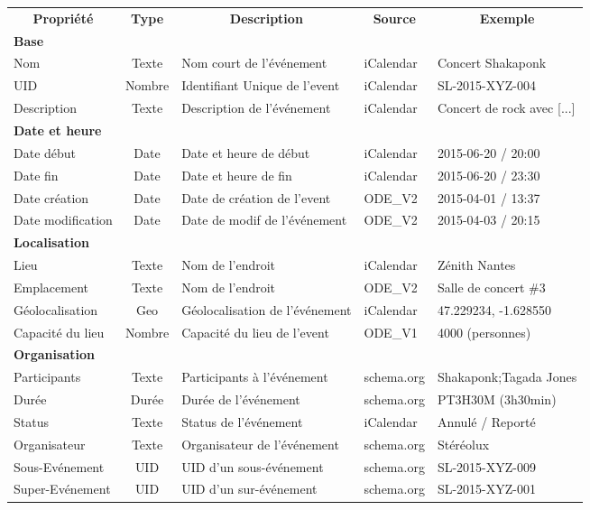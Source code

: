 \begin{table}[h]
\begin{adjustwidth}{-1.8cm}{}
\begin{tabular}{lclll}
\multicolumn{1}{c}{{\bf Propriété}} & {\bf Type} & \multicolumn{1}{c}{{\bf Description}} & \multicolumn{1}{c}{{\bf Source}} & \multicolumn{1}{c}{{\bf Exemple}} \\

{\bf Base} &  &  &  &  \\

Nom & Texte & Nom court de l'événement & iCalendar & Concert Shakaponk \\
UID & Nombre & Identifiant Unique de l'event & iCalendar & SL-2015-XYZ-004 \\
Description & Texte & Description de l'événement & iCalendar & Concert de rock avec {[}...{]} \\

{\bf Date et heure} &  &  &  &  \\

Date début & Date & Date et heure de début & iCalendar & 2015-06-20 / 20:00 \\
Date fin & Date & Date et heure de fin & iCalendar & 2015-06-20 / 23:30 \\
Date création & Date & Date de création de l'event & ODE\_V2 & 2015-04-01 / 13:37 \\
Date modification & Date & Date de modif de l'événement & ODE\_V2 & 2015-04-03 / 20:15 \\

{\bf Localisation} &  &  &  &  \\

Lieu & Texte & Nom de l'endroit & iCalendar & Zénith Nantes \\
Emplacement & Texte & Nom de l'endroit & ODE\_V2 & Salle de concert \#3 \\
Géolocalisation & Geo & Géolocalisation de l'événement & iCalendar & 47.229234, -1.628550 \\
Capacité du lieu & Nombre & Capacité du lieu de l'event & ODE\_V1 & 4000 (personnes) \\

{\bf Organisation} &  &  &  &  \\

Participants & Texte & Participants à l'événement & schema.org & Shakaponk;Tagada Jones \\
Durée & Durée & Durée de l'événement & schema.org & PT3H30M (3h30min) \\
Status & Texte & Status de l'événement & iCalendar & Annulé / Reporté \\
Organisateur & Texte & Organisateur de l'événement & schema.org & Stéréolux \\
Sous-Evénement & UID & UID d'un sous-événement & schema.org & SL-2015-XYZ-009 \\
Super-Evénement & UID & UID d'un sur-événement & schema.org & SL-2015-XYZ-001 \\


\end{tabular}
\end{adjustwidth}
\end{table}
